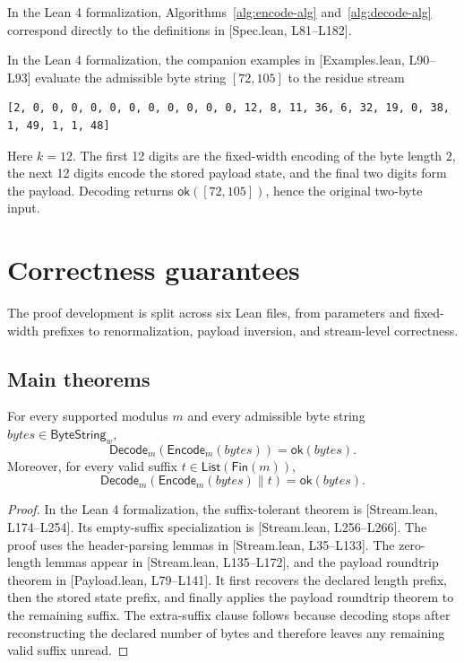 \documentclass{system-security-article}
\providecommand{\href}[2]{#2}
\newcommand{\ByteString}{\mathsf{ByteString}}
\newcommand{\ByteStringBounded}{\ByteString_{w}}
\newcommand{\EncodeM}{\mathsf{Encode}_m}
\newcommand{\DecodeM}{\mathsf{Decode}_m}
\newcommand{\List}{\mathsf{List}}
\newcommand{\Fin}{\mathsf{Fin}}
\newcommand{\OK}{\mathsf{ok}}
\newcommand{\concat}{\mathbin{\|}}
\newcommand{\BytesVar}{\mathit{bytes}}
\newcommand{\LeanSpec}[2]{\href{https://github.com/KyrylR/phd-symmetric-cryptography/blob/8e903222a7df1c4365592e4b16fa752a924b8977/lean/encoding-dr-1/EncodingProofs/BaseMLen/Spec.lean\#L#1-L#2}{[Spec.lean, L#1--L#2]}}
\newcommand{\LeanPayload}[2]{\href{https://github.com/KyrylR/phd-symmetric-cryptography/blob/8e903222a7df1c4365592e4b16fa752a924b8977/lean/encoding-dr-1/EncodingProofs/BaseMLen/Payload.lean\#L#1-L#2}{[Payload.lean, L#1--L#2]}}
\newcommand{\LeanStream}[2]{\href{https://github.com/KyrylR/phd-symmetric-cryptography/blob/8e903222a7df1c4365592e4b16fa752a924b8977/lean/encoding-dr-1/EncodingProofs/BaseMLen/Stream.lean\#L#1-L#2}{[Stream.lean, L#1--L#2]}}
\newcommand{\LeanExamples}[2]{\href{https://github.com/KyrylR/phd-symmetric-cryptography/blob/8e903222a7df1c4365592e4b16fa752a924b8977/lean/encoding-dr-1/EncodingProofs/BaseMLen/Examples.lean\#L#1-L#2}{[Examples.lean, L#1--L#2]}}
\begin{document}
    In the Lean 4 formalization, Algorithms~\ref{alg:encode-alg} and~\ref{alg:decode-alg} correspond directly to the definitions in \LeanSpec{81}{182}.

    \begin{example}[Worked example for ``Hi'' at \(m=50\) and \(w=64\)]
        In the Lean 4 formalization, the companion examples in \LeanExamples{90}{93} evaluate the admissible byte string \([72,105]\) to the residue stream
        \begin{lstlisting}[numbers=none,label={lst:lstlisting}]
[2, 0, 0, 0, 0, 0, 0, 0, 0, 0, 0, 0, 12, 8, 11, 36, 6, 32, 19, 0, 38, 1, 49, 1, 1, 48]
        \end{lstlisting}
        Here \(k = 12\).
        The first 12 digits are the fixed-width encoding of the byte length
        \(2\), the next 12 digits encode the stored payload state, and the final two digits form the payload.
        Decoding returns \(\OK([72,105])\), hence the original two-byte input.
    \end{example}

    \section{Correctness guarantees}
    \label{sec:correctness}

    The proof development is split across six Lean files, from parameters and fixed-width prefixes to
    renormalization, payload inversion, and stream-level correctness.

    \subsection{Main theorems}
    \label{subsec:main-theorems}

    \begin{theorem}
        \label{thm:stream-roundtrip}
        For every supported modulus \(m\) and every admissible byte string
        \(\BytesVar \in \ByteStringBounded\),
        \[
            \DecodeM(\EncodeM(\BytesVar)) = \OK(\BytesVar).
        \]
        Moreover, for every valid suffix \(t \in \List(\Fin(m))\),
        \[
            \DecodeM(\EncodeM(\BytesVar) \concat t) = \OK(\BytesVar).
        \]
    \end{theorem}

    \begin{proof}
        In the Lean 4 formalization, the suffix-tolerant theorem is \LeanStream{174}{254}.
        Its empty-suffix specialization is \LeanStream{256}{266}.
        The proof uses the header-parsing lemmas in \LeanStream{35}{133}.
        The zero-length lemmas appear in \LeanStream{135}{172}, and the payload roundtrip theorem in
        \LeanPayload{79}{141}.
        It first recovers the declared length prefix, then the stored state prefix, and finally applies the
        payload roundtrip theorem to the remaining suffix.
        The extra-suffix clause follows because decoding stops after reconstructing the declared number
        of bytes and therefore leaves any remaining valid suffix unread.
    \end{proof}
\end{document}
